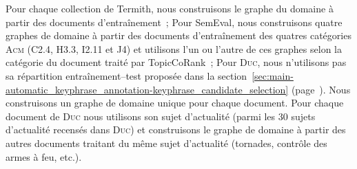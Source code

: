         Pour chaque collection de Termith, nous construisons le graphe du
        domaine à partir des documents d'entraînement~; Pour SemEval, nous
        construisons quatre graphes de domaine à partir des documents
        d'entraînement des quatres catégories \textsc{Acm} (C2.4, H3.3, I2.11 et
        J4) et utilisons l'un ou l'autre de ces graphes selon la catégorie du
        document traité par TopicCoRank~; Pour \textsc{Duc}, nous n'utilisons
        pas sa répartition entraînement--test proposée dans la
        section~\ref{sec:main-automatic_keyphrase_annotation-keyphrase_candidate_selection}
        (page~\pageref{sec:main-automatic_keyphrase_annotation-keyphrase_candidate_selection}).
        Nous construisons un graphe de domaine unique pour chaque document. Pour
        chaque document de \textsc{Duc} nous utilisons son sujet d'actualité
        (parmi les 30 sujets d'actualité recensés dans \textsc{Duc}) et
        construisons le graphe de domaine à partir des autres documents traitant
        du même sujet d'actualité (tornades, contrôle des armes à feu, etc.).


